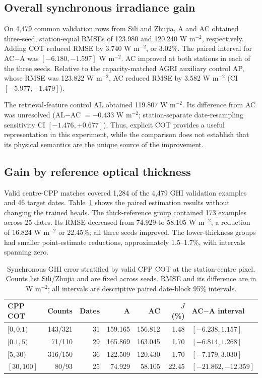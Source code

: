 \documentclass[11pt]{article}
\begin{document}
\subsection{Overall synchronous irradiance gain}
On 4,479 common validation rows from Sili and Zhujia, A and AC obtained three-seed, station-equal RMSEs of 123.980 and 120.240 W m$^{-2}$, respectively. Adding COT reduced RMSE by 3.740 W m$^{-2}$, or 3.02\%. The paired interval for AC$-$A was $[-6.180,-1.597]$ W m$^{-2}$. AC improved at both stations in each of the three seeds. Relative to the capacity-matched AGRI auxiliary control AP, whose RMSE was 123.822 W m$^{-2}$, AC reduced RMSE by 3.582 W m$^{-2}$ (CI $[-5.977,-1.479]$).

The retrieval-feature control AL obtained 119.807 W m$^{-2}$. Its difference from AC was unresolved (AL$-$AC $=-0.433$ W m$^{-2}$; station-separate date-resampling sensitivity CI $[-1.476,+0.677]$). Thus, explicit COT provides a useful representation in this experiment, while the comparison does not establish that its physical semantics are the unique source of the improvement.

\subsection{Gain by reference optical thickness}
Valid centre-CPP matches covered 1,284 of the 4,479 GHI validation examples and 46 target dates. Table~\ref{tab:thickness} shows the paired estimation results without changing the trained heads. The thick-reference group contained 173 examples across 25 dates. Its RMSE decreased from 74.929 to 58.105 W m$^{-2}$, a reduction of 16.824 W m$^{-2}$ or 22.45\%; all three seeds improved. The lower-thickness groups had smaller point-estimate reductions, approximately 1.5--1.7\%, with intervals spanning zero.

\begin{table}[t]
\centering\small
\caption{Synchronous GHI error stratified by valid CPP COT at the station-centre pixel. Counts list Sili/Zhujia and are fixed across seeds. RMSE and its difference are in W m$^{-2}$; all intervals are descriptive paired date-block 95\% intervals.}
\label{tab:thickness}
\setlength{\tabcolsep}{4pt}
\begin{tabular}{lrrrrrl}
\toprule
CPP COT & Counts & Dates & A & AC & $J$ (\%) & AC$-$A interval\\
\midrule
$[0,0.1)$ & 143/321 & 31 & 159.165 & 156.812 & 1.48 & $[-6.238,1.157]$\\
$[0.1,5)$ & 71/110 & 29 & 165.869 & 163.045 & 1.70 & $[-6.814,1.268]$\\
$[5,30)$ & 316/150 & 36 & 122.509 & 120.430 & 1.70 & $[-7.179,3.030]$\\
$[30,100]$ & 80/93 & 25 & 74.929 & 58.105 & 22.45 & $[-21.862,-12.359]$\\
\bottomrule
\end{tabular}
\end{table}
\end{document}
